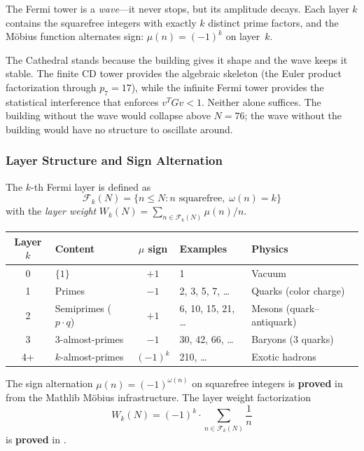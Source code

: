 The Fermi tower is a \emph{wave}---it never stops, but its
amplitude decays. Each layer $k$ contains the squarefree integers
with exactly $k$ distinct prime factors, and the M\"obius function
alternates sign: $\mu(n) = (-1)^k$ on layer~$k$.

\begin{correspondence}[Building + Wave = Cathedral]
The Cathedral stands because the building gives it shape and
the wave keeps it stable. The finite CD tower provides the
algebraic skeleton (the Euler product factorization through
$p_7 = 17$), while the infinite Fermi tower provides the
statistical interference that enforces $v^T G v < 1$.
Neither alone suffices. The building without the wave would
collapse above $N = 76$; the wave without the building would
have no structure to oscillate around.
\end{correspondence}

\subsubsection{Layer Structure and Sign Alternation}

The $k$-th Fermi layer is defined as
\[
  \mathcal{F}_k(N) = \{n \leq N : n \text{ squarefree}, \; \omega(n) = k\}
\]
with the \emph{layer weight}
$W_k(N) = \sum_{n \in \mathcal{F}_k(N)} \mu(n)/n$.

\begin{center}
\small
\begin{tabular}{@{}clcll@{}}
\toprule
\textbf{Layer $k$} & \textbf{Content} & $\mu$ \textbf{sign} & \textbf{Examples} & \textbf{Physics} \\
\midrule
0 & $\{1\}$             & $+1$   & 1                  & Vacuum \\
1 & Primes              & $-1$   & 2, 3, 5, 7, \ldots & Quarks (color charge) \\
2 & Semiprimes ($p \cdot q$) & $+1$ & 6, 10, 15, 21, \ldots & Mesons (quark--antiquark) \\
3 & 3-almost-primes     & $-1$   & 30, 42, 66, \ldots & Baryons (3 quarks) \\
4+ & $k$-almost-primes   & $(-1)^k$ & 210, \ldots       & Exotic hadrons \\
\bottomrule
\end{tabular}
\end{center}

The sign alternation $\mu(n) = (-1)^{\omega(n)}$ on squarefree
integers is \textbf{proved} in 
from the Mathlib M\"obius infrastructure. The layer weight
factorization
\[
  W_k(N) = (-1)^k \cdot \sum_{n \in \mathcal{F}_k(N)} \frac{1}{n}
\]
is \textbf{proved} in .

